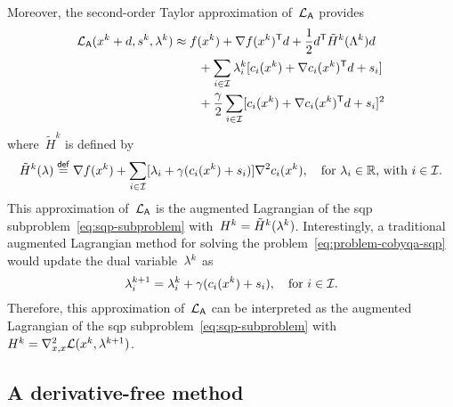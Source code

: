 Moreover, the second-order Taylor approximation of~$\lag[\mathsf{A}]$ provides
\begin{align*}
    \lag[\mathsf{A}](\iter[k] + d, s^k, \lm[k]) & \approx \obj(\iter[k]) + \nabla \obj(\iter[k])^{\T} d + \frac{1}{2} d^{\T} \tilde{H}^k(\Lambda^k) d\\
                                                & \qquad + \sum_{i \in \iub} \lm[k]_i [\con{i}(\iter[k]) + \nabla \con{i}(\iter[k])^{\T} d + s_i]\\
                                                & \qquad + \frac{\gamma}{2} \sum_{i \in \iub} [\con{i}(\iter[k]) + \nabla \con{i}(\iter[k])^{\T} d + s_i]^2\\
\end{align*}
where~$\tilde{H}^k$ is defined by
\begin{equation*}
    \tilde{H}^k(\lm) \eqdef \nabla \obj(\iter[k]) + \sum_{i \in \iub} [\lm_i + \gamma (\con{i}(\iter[k]) + s_i)] \nabla^2 \con{i}(\iter[k]), \quad \text{for~$\lm_i \in \R$, with~$i \in \iub$.}
\end{equation*}
This approximation of~$\lag[\mathsf{A}]$ is the augmented Lagrangian of the \gls{sqp} subproblem~\cref{eq:sqp-subproblem} with~$H^k = \tilde{H}^k(\lm[k])$.
Interestingly, a traditional augmented Lagrangian method for solving the problem~\cref{eq:problem-cobyqa-sqp} would update the dual variable~$\lm[k]$ as
\begin{equation*}
    \lm_i^{k + 1} = \lm[k]_i + \gamma (\con{i}(\iter[k]) + s_i), \quad \text{for~$i \in \iub$}.
\end{equation*}
Therefore, this approximation of~$\lag[\mathsf{A}]$ can be interpreted as the augmented Lagrangian of the \gls{sqp} subproblem~\cref{eq:sqp-subproblem} with~$H^k = \nabla_{x, x}^2 \lag(\iter[k], \lm[k + 1])$.

\subsection{A derivative-free  method}
\label{subsec:derivative-free-sqp}

